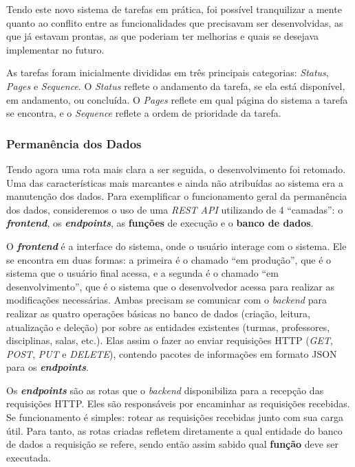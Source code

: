 Tendo este novo sistema de tarefas em prática, foi possível tranquilizar a mente quanto ao conflito entre as funcionalidades que precisavam ser desenvolvidas, as que já estavam prontas, as que poderiam ter melhorias e quais se desejava implementar no futuro.

As tarefas foram inicialmente divididas em três principais categorias: \textit{Status}, \textit{Pages} e \textit{Sequence}. O \textit{Status} reflete o andamento da tarefa, se ela está disponível, em andamento, ou concluída. O \textit{Pages} reflete em qual página do sistema a tarefa se encontra, e o \textit{Sequence} reflete a ordem de prioridade da tarefa.

\subsubsection{Permanência dos Dados} \label{sssec:Permanência dos Dados}

Tendo agora uma rota mais clara a ser seguida, o desenvolvimento foi retomado. Uma das características mais marcantes e ainda não atribuídas ao sistema era a manutenção dos dados. Para exemplificar o funcionamento geral da permanência dos dados, consideremos o uso de uma \textit{REST API} utilizando de 4 ``camadas'': o \textbf{\textit{frontend}}, os \textbf{\textit{endpoints}}, as \textbf{funções} de execução e o \textbf{banco de dados}.

O \textbf{\textit{frontend}} é a interface do sistema, onde o usuário interage com o sistema. Ele se encontra em duas formas: a primeira é o chamado ``em produção'', que é o sistema que o usuário final acessa, e a segunda é o chamado ``em desenvolvimento'', que é o sistema que o desenvolvedor acessa para realizar as modificações necessárias. Ambas precisam se comunicar com o \textit{backend} para realizar as quatro operações básicas no banco de dados (criação, leitura, atualização e deleção) por sobre as entidades existentes (turmas, professores, disciplinas, salas, etc.). Elas assim o fazer ao enviar requisições HTTP (\textit{GET}, \textit{POST}, \textit{PUT} e \textit{DELETE}), contendo pacotes de informações em formato JSON para os \textbf{\textit{endpoints}}.

Os \textbf{\textit{endpoints}} são as rotas que o \textit{backend} disponibiliza para a recepção das requisições HTTP. Eles são responsáveis por encaminhar as requisições recebidas. Se funcionamento é simples: rotear as requisições recebidas junto com sua carga útil. Para tanto, as rotas criadas refletem diretamente a qual entidade do banco de dados a requisição se refere, sendo então assim sabido qual \textbf{função} deve ser executada.

